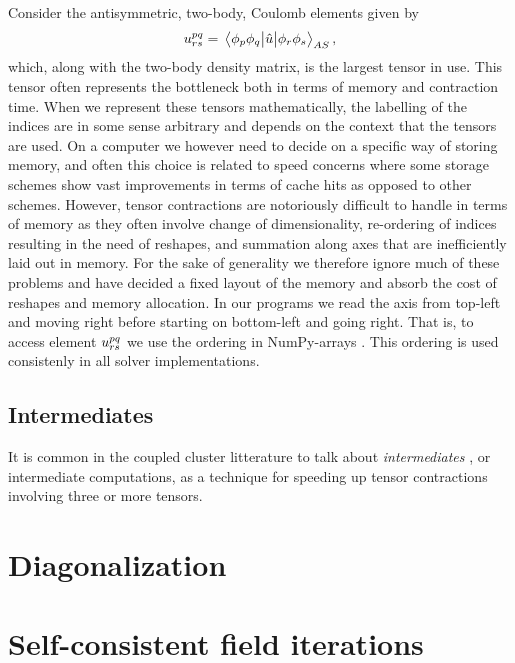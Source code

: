         Consider the antisymmetric, two-body, Coulomb elements given by
        \begin{align}
            u^{pq}_{rs}
            = \mel{\phi_p\phi_q}{\hat{u}}{\phi_r\phi_s}_{AS},
        \end{align}
        which, along with the two-body density matrix, is the largest tensor in
        use.
        This tensor often represents the bottleneck both in terms of memory and
        contraction time.
        When we represent these tensors mathematically, the labelling of the
        indices are in some sense arbitrary and depends on the context that the
        tensors are used.
        On a computer we however need to decide on a specific way of storing
        memory, and often this choice is related to speed concerns where some
        storage schemes show vast improvements in terms of cache hits as opposed
        to other schemes.
        However, tensor contractions are notoriously difficult to handle in
        terms of memory as they often involve change of dimensionality,
        re-ordering of indices resulting in the need of reshapes, and summation
        along axes that are inefficiently laid out in memory.
        For the sake of generality we therefore ignore much of these problems
        and have decided a fixed layout of the memory and absorb the cost of
        reshapes and memory allocation.
        In our programs we read the axis from top-left and moving right before
        starting on bottom-left and going right.
        That is, to access element $u^{pq}_{rs}$ we use the ordering
         in NumPy-arrays \cite{numpy}.
        This ordering is used consistenly in all solver implementations.

        \subsection{Intermediates}
            It is common in the coupled cluster litterature to talk about
            \emph{intermediates} \cite{hjorth2017advanced, gauss1995coupled}, or
            intermediate computations, as a technique for speeding up tensor
            contractions involving three or more tensors.

    \section{Diagonalization}
    \section{Self-consistent field iterations}
